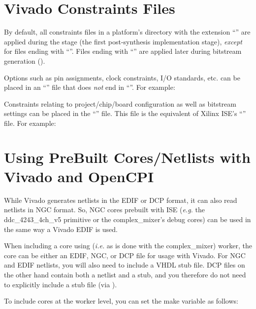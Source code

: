 \begin{flushleft}
\section{Vivado Constraints Files}
By default, all constraints files in a platform's directory with the extension ``'' are applied during the  stage (the first post-synthesis implementation stage), \textit{except} for files ending with ``''. Files ending with ``'' are applied later during bitstream generation ().\newline

Options such as pin assignments, clock constraints, I/O standards, etc. can be placed in an ``'' file that does \textit{not} end in ``''. For example:\newline
{}\newline

Constraints relating to project/chip/board configuration as well as bitstream settings can be placed in the ``'' file. This file is the equivalent of Xilinx ISE's ``'' file. For example:\newline
{}


\section{Using PreBuilt Cores/Netlists with Vivado and OpenCPI}
\label{prebuiltcore}
While Vivado generates netlists in the EDIF or DCP format, it can also read netlists in NGC format. So, NGC cores prebuilt with ISE (\textit{e.g.} the ddc\_4243\_4ch\_v5 primitive or the complex\_mixer's debug cores) can be used in the same way a Vivado EDIF is used. \newline

When including a core using  (\textit{i.e.} as is done with the complex\_mixer) worker, the core can be either an EDIF, NGC, or DCP file for usage with Vivado. For NGC and EDIF netlists, you will also need to include a VHDL stub file.
DCP files on the other hand contain both a netlist and a stub, and you therefore do not need to explicitly include a stub file (via ).\newline

To include cores at the worker level, you can set the  make variable as follows:\newline
{}\newline


\end{flushleft}
